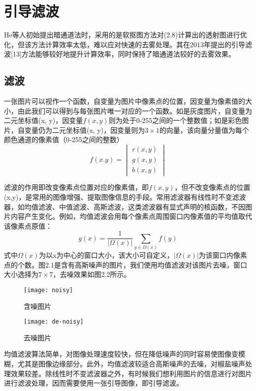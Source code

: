 \documentclass[a4paper, 12pt]{report}
\begin{document}
\section{引导滤波\quad}
He等人初始提出暗通道法时，采用的是软抠图方法对(2.8)计算出的透射图进行优化，但该方法计算效率太低，难以应对快速的去雾处理。其在2013年提出的引导滤波[13]方法能够较好地提升计算效率，同时保持了暗通道法较好的去雾效果。

\subsection{滤波\quad}
一张图片可以视作一个函数，自变量为图片中像素点的位置，因变量为像素值的大小，由此我们可以得到与每张图片唯一对应的一个函数。如是灰度图片，自变量为二元坐标值(x, y)，因变量$f(x, y)$则为处于0-255之间的一个整数值；如是彩色图片，自变量仍为二元坐标值(x, y)，因变量则为$3\times 1$的向量，该向量分量值为每个颜色通道的像素值（0-255之间的整数）
$$ f(x. y) = 
\begin{vmatrix}
  r(x, y) \\
  g(x, y) \\
  b(x, y)  
\end{vmatrix}
$$

滤波的作用即改变像素点位置对应的像素值，即$f(x,y)$，但不改变像素点的位置(x,y)，是常用的图像增强、提取图像信息的手段。常用滤波器有线性时不变滤波器，如均值滤波、中值滤波、高斯滤波，这类滤波器有显式声明的核函数，不因图片内容产生变化。例如，均值滤波会用每个像素点周围窗口内像素值的平均值取代该像素点原值：
$$g(x) = \frac{1}{|\Omega(x)|}\sum_{y \in \Omega(x)}f(y)$$
式中$\Omega(x)$为以x为中心的窗口大小，该大小可自定义，$|\Omega(x)|$为该窗口内像素点的个数。图2.1是含有高斯噪声的图片，我们使用均值滤波对该图片去噪，窗口大小选择为$7\times 7$，去噪效果如图2.2所示。
\begin{figure}[htbp]
\centering
\begin{minipage}[t]{0.48\textwidth}
\centering
\texttt{[image: noisy]}
\caption{含噪图片}
\end{minipage}
\begin{minipage}[t]{0.48\textwidth}
\centering
\texttt{[image: de-noisy]}
\caption{去噪图片}
\end{minipage}
\end{figure}
均值滤波算法简单，对图像处理速度较快，但在降低噪声的同时容易使图像变模糊，尤其是图像边缘部分。此外，均值滤波较适合高斯噪声的去噪，对椒盐噪声处理效果较差。除线性时不变滤波器之外，有时候我们想利用图片的信息进行对图片进行滤波处理，因而需要使用一张引导图像，即引导滤波。
\end{document}
